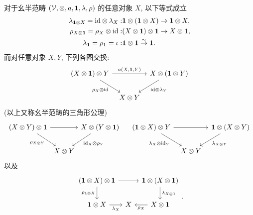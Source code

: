 \begin{lemma}[G.\ M.\ Kelly]\label{prop:Kelly}
	对于幺半范畴 $(\mathcal{V}, \otimes, a, \mathbf{1}, \lambda, \rho)$ 的任意对象 $X$, 以下等式成立
	\begin{align}
		\label{eqn:unit-coherence-2a} \lambda_{\mathbf{1} \otimes X} = \mathrm{id} \otimes \lambda_X: &  \mathbf{1} \otimes (\mathbf{1} \otimes X) \to \mathbf{1} \otimes X, \\
		\label{eqn:unit-coherence-2b} \rho_{X \otimes \mathbf{1}} = \rho_X \otimes \mathrm{id}: & (X \otimes \mathbf{1}) \otimes \mathbf{1} \to X \otimes \mathbf{1}, \\
		\label{eqn:unit-coherence-2c} \lambda_{\mathbf{1}} = \rho_{\mathbf{1}} = \iota: & \mathbf{1} \otimes \mathbf{1} \stackrel{\sim}{\rightarrow} \mathbf{1}.
	\end{align}
	而对任意对象 $X, Y$, 下列各图交换:
	\begin{equation}\label{eqn:monoidal-cat-unit}\begin{tikzcd}[column sep=tiny]
		(X \otimes \munit) \otimes Y \arrow[rr, "{a(X, \munit, Y)}"] \arrow[rd, "{\rho_X \otimes \identity}"'] & & X \otimes (\munit \otimes Y) \arrow[ld, "{\identity \otimes \lambda_Y}"] \\
		& X \otimes Y &
	\end{tikzcd} \end{equation}
	(以上又称幺半范畴的三角形公理)
	\begin{equation}\label{eqn:unit-coherence-1} \begin{tikzcd}[column sep=0.2ex]
		(X \otimes Y) \otimes \munit \arrow[rr] \arrow[rd, "{\rho_{X \otimes Y}}"'] & & X \otimes (Y \otimes \munit) \arrow[ld, "{\identity_X \otimes \rho_Y}"] \\
		& X \otimes Y &
	\end{tikzcd} \quad
	\begin{tikzcd}[column sep=tiny]
		(\munit \otimes X) \otimes Y \arrow[rr] \arrow[rd, "{\lambda_X \otimes \identity_Y}"'] & & \munit \otimes (X \otimes Y) \arrow[ld, "{\lambda_{X \otimes Y}}"] \\
		& X \otimes Y &
	\end{tikzcd} \end{equation}
	以及
	\begin{equation}\label{eqn:unit-coherence-3} \begin{tikzcd}[column sep=tiny]
		(\munit \otimes X) \otimes \munit \arrow[d, "{\rho_{\munit \otimes X}}"'] \arrow[rr] & & \munit \otimes (X \otimes \munit) \arrow[d, "{\lambda_{X \otimes \munit}}"] \\
		\munit \otimes X \arrow[r, "{\lambda_X}"'] & X & X \otimes \munit \arrow[l, "{\rho_X}"] \\
	\end{tikzcd}. \end{equation}
\end{lemma}
